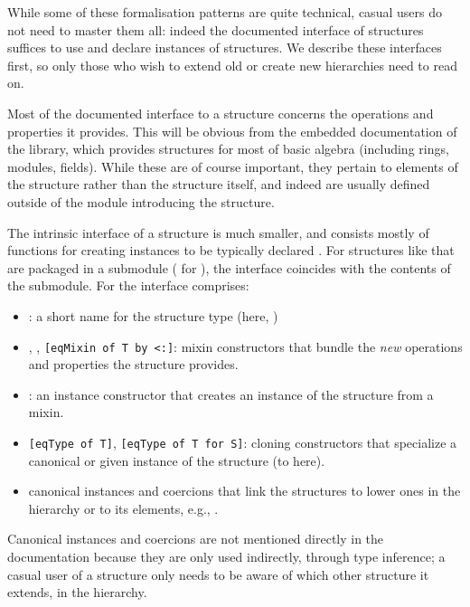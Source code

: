 While some of these formalisation patterns are quite technical, casual
users do not need to master them all: indeed the documented interface
of structures suffices to use and declare instances of structures. We
describe these interfaces first, so only those who wish to extend old
or create new hierarchies need to read on.

\label{str:itf}

Most of the documented interface to a structure concerns the operations and
properties it provides. This will be obvious from the embedded
documentation of the  library, which provides structures for
most of basic algebra (including rings, modules, fields). While these
are of course important, they pertain to elements of the structure
rather than the structure itself, and indeed are usually defined
outside of the module introducing the structure.

The intrinsic interface of a structure is much smaller, and consists mostly
of functions for creating instances to be typically
declared . For structures like 
that are packaged in a submodule ( for ), the
interface coincides with the contents of the  submodule.
For  the interface comprises:
\begin{itemize}
\item {}: a short name for the structure type (here,
  )
\item {}, , \lstinline/[eqMixin of T by <:]/:
  mixin constructors that bundle the \emph{new} operations and
  properties the structure provides.
\item {}: an instance constructor that creates an instance of
  the structure from a mixin.  
\item \lstinline/[eqType of T]/, \lstinline/[eqType of T for S]/:
  cloning constructors that specialize a canonical or given instance
  of the structure (to  here).
\item canonical instances and coercions that link the structures to lower ones
  in the hierarchy or to its elements, e.g., .
\end{itemize}
\index[coq]{\C{[eqMixin of .. by <:]}}
\index[coq]{\C{[eqType of ..]}}
Canonical instances and coercions are not mentioned directly in the
documentation because they are only used indirectly, through type
inference; a casual user of a structure only needs to be aware of which other
structure it extends, in the hierarchy.

